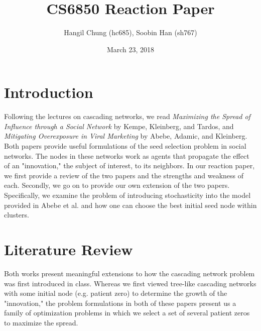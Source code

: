 \documentclass{article}
\begin{document}
\title{CS6850 Reaction Paper}
\author{Hangil Chung (hc685), Soobin Han (sh767)}
\date{March 23, 2018}

\maketitle


\section{Introduction}
Following the lectures on cascading networks, we read \textit{Maximizing the Spread of Influence through a Social Network} by Kempe, Kleinberg, and Tardos, and \textit{Mitigating Overexposure in Viral Marketing} by Abebe, Adamic, and Kleinberg. Both papers provide useful formulations of the seed selection problem in social networks. The nodes in these networks work as agents that propagate the effect of an "innovation," the subject of interest, to its neighbors. In our reaction paper, we first provide a review of the two papers and the strengths and weakness of each. Secondly, we go on to provide our own extension of the two papers. Specifically, we examine the problem of introducing stochasticity into the model provided in Abebe et al. and how one can choose the best initial seed node within clusters.

\section{Literature Review}
Both works present meaningful extensions to how the cascading network problem was first introduced in class. Whereas we first viewed tree-like cascading networks with some initial node (e.g. patient zero) to determine the growth of the "innovation," the problem formulations in both of these papers present us a family of optimization problems in which we select a set of several patient zeros to maximize the spread.
\end{document}

